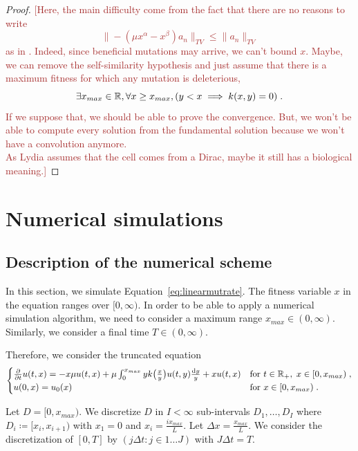 \documentclass[11pt]{amsart}
\newcommand{\ndr}[1]{\textcolor{brown}{[#1]}}
\begin{document}
\begin{proof}
\ndr{Here, the main difficulty come from the fact that there are no reasons to write 
$$ \| -(\mu x^\alpha - x^\beta) a_n\|_{TV} \leq \| a_n \|_{TV}$$
as in \cite[p.16]{doumic2021inverse}. Indeed, since beneficial mutations may arrive, we can't bound $x$. Maybe, we can remove the self-similarity hypothesis and just assume that there is a maximum fitness for which any mutation is deleterious, \ie 
$$ \exists x_{max} \in \mathbb{R}, \forall x \geq x_{max}, (y < x \implies k(x,y) = 0) \; .$$
If we suppose that, we should be able to prove the convergence. But, we won't be able to compute every solution from the fundamental solution because we won't have a convolution anymore. \\
As Lydia assumes that the cell comes from a Dirac, maybe it still has a biological meaning.}
\end{proof}


\appendix

\section{Numerical simulations}

\subsection{Description of the numerical scheme}
\label{s:num_schme}

In this section, we simulate Equation~\eqref{eq:linearmutrate}. The fitness variable $x$ in the equation ranges over $[0,\infty)$. In order to be able to apply a numerical simulation algorithm, we need to consider a maximum range $x_{max} \in (0,\infty)$. Similarly, we consider a final time $T \in (0,\infty)$.

Therefore, we consider the truncated equation
\begin{equation}
    \begin{cases}
	\frac{\partial}{\partial t}u(t,x) = - x\mu u(t,x) + \mu \int_{0}^{x_{max}} y k\big( \frac{x}{y}\big) u(t,y) \frac{\mathrm dy}{y} 
    + xu(t,x)
	& \text{for }t \in \mathbb{R}_+, \; x \in [0,x_{max}) \; ,
	\\
	u(0, x) = u_0(x)
	& \text{for } x \in [0,x_{max})
	\; .
    \end{cases}
    \label{eq:linearmutratetrunc}
\end{equation}

Let $D = [0, x_{max})$. We discretize $D$ in $I < \infty$ sub-intervals
$D_1, \ldots, D_I$ where $D_i \coloneqq [x_i, x_{i+1})$ with $x_1 = 0$ and $x_i = \frac{i x_{max}}{L}$. Let $\Delta x = \frac{x_{max}}{L}$. We consider the discretization of $[0,T]$ by $(j\Delta t : j \in 1\ldots J )$ with $J \Delta t = T$.\\ 
\end{document}
